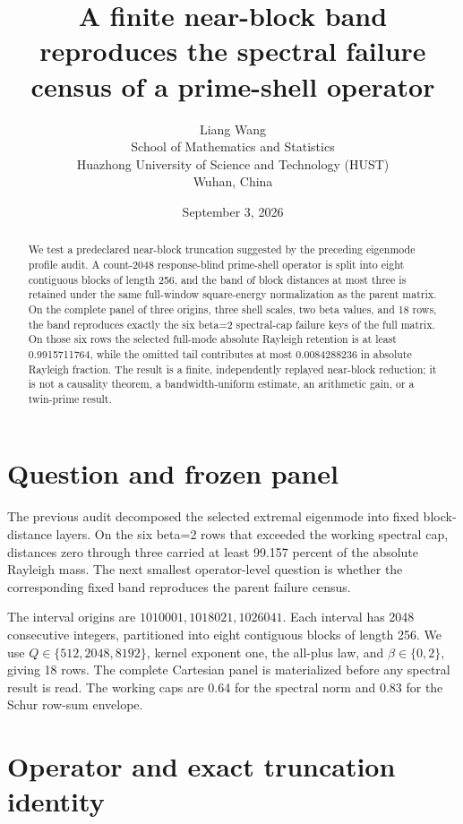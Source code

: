 \documentclass[10pt]{article}
\title{A finite near-block band reproduces the spectral\newline
failure census of a prime-shell operator}
\author{Liang Wang\\
School of Mathematics and Statistics\\
Huazhong University of Science and Technology (HUST)\\
Wuhan, China}
\date{September 3, 2026}
\begin{document}
\maketitle

\begin{abstract}
We test a predeclared near-block truncation suggested by the preceding
eigenmode profile audit.  A count-2048 response-blind prime-shell operator is
split into eight contiguous blocks of length 256, and the band of block
distances at most three is retained under the same full-window square-energy
normalization as the parent matrix.  On the complete panel of three origins,
three shell scales, two beta values, and 18 rows, the band reproduces exactly
the six beta=2 spectral-cap failure keys of the full matrix.  On those six
rows the selected full-mode absolute Rayleigh retention is at least
0.9915711764, while the omitted tail contributes at most 0.0084288236 in
absolute Rayleigh fraction.  The result is a finite, independently replayed
near-block reduction; it is not a causality theorem, a bandwidth-uniform
estimate, an arithmetic gain, or a twin-prime result.
\end{abstract}

\section{Question and frozen panel}

The previous audit decomposed the selected extremal eigenmode into fixed
block-distance layers.  On the six beta=2 rows that exceeded the working
spectral cap, distances zero through three carried at least 99.157 percent
of the absolute Rayleigh mass.  The next smallest operator-level question is
whether the corresponding fixed band reproduces the parent failure census.

The interval origins are
\(1010001,1018021,1026041\).  Each interval has 2048 consecutive integers,
partitioned into eight contiguous blocks of length 256.  We use
\(Q\in\{512,2048,8192\}\), kernel exponent one, the all-plus law, and
\(\beta\in\{0,2\}\), giving 18 rows.  The complete Cartesian panel is
materialized before any spectral result is read.  The working caps are
0.64 for the spectral norm and 0.83 for the Schur row-sum envelope.

\section{Operator and exact truncation identity}
\end{document}
